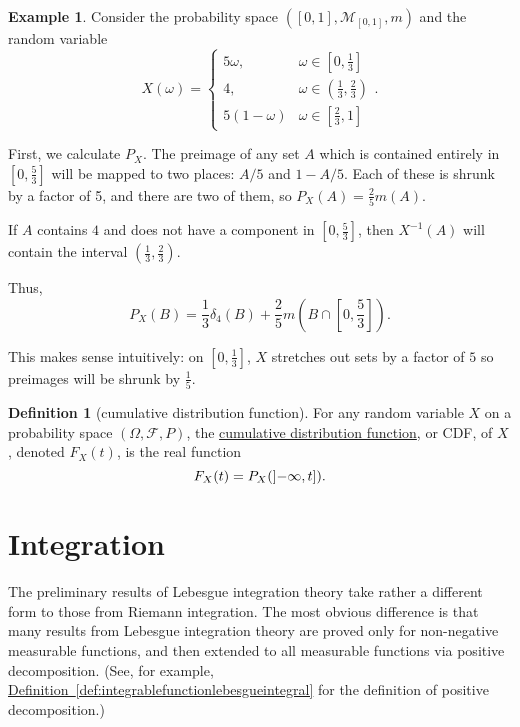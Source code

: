 \documentclass[a4paper]{scrartcl}
\newcommand{\defn}[1]{\ul{#1}}
\theoremstyle{definition}
\newtheorem{definition}{Definition}[section]
\newtheorem{example}{Example}[section]
\theoremstyle{plain}
\theoremstyle{remark}
\begin{document}
\begin{example}
  \label{eg:probabilitygeneratedbycomplicatedishfunction}
  Consider the probability space $\left( [0, 1], \mathcal{M}_{[0, 1]}, m \right)$ and the random variable
  \begin{equation*}
    X(\omega) =
    \begin{cases}
      5\omega, & \omega \in \left[ 0, \frac{1}{3} \right] \\
      4, & \omega \in \left( \frac{1}{3}, \frac{2}{3} \right) \\
      5(1-\omega) & \omega \in \left[ \frac{2}{3}, 1 \right]
    \end{cases}.
  \end{equation*}

  First, we calculate $P_{X}$. The preimage of any set $A$ which is contained entirely in $\left[ 0, \frac{5}{3} \right]$ will be mapped to two places: $A/5$ and $1 - A/5$. Each of these is shrunk by a factor of 5, and there are two of them, so $P_{X}(A) = \frac{2}{5}m(A)$.

  If $A$ contains $4$ and does not have a component in $\left[ 0, \frac{5}{3} \right]$, then $X^{-1}(A)$ will contain the interval $\left( \frac{1}{3}, \frac{2}{3} \right)$.

  Thus,
  \begin{equation*}
    P_{X}(B) = \frac{1}{3}\delta_{4}(B) + \frac{2}{5} m\left( B \cap \left[ 0, \frac{5}{3} \right] \right).
  \end{equation*}
\end{example}

This makes sense intuitively: on $[0, \frac{1}{3}]$, $X$ stretches out sets by a factor of $5$ so preimages will be shrunk by $\frac{1}{5}$.

\begin{definition}[cumulative distribution function]
  \label{def:cumulativedistributionfunction}
  For any random variable $X$ on a probability space $(\Omega, \mathcal{F}, P)$, the \defn{cumulative distribution function}, or CDF, of $X$, denoted $F_{X}(t)$, is the real function
  \begin{equation*}
  F_{X}(t) = P_{X}(\interval[open left]{-\infty}{t}).
\end{equation*}
\end{definition}
\section{Integration}
The preliminary results of Lebesgue integration theory take rather a different form to those from Riemann integration. The most obvious difference is that many results from Lebesgue integration theory are proved only for non-negative measurable functions, and then extended to all measurable functions via positive decomposition. (See, for example, \hyperref[def:integrablefunctionlebesgueintegral]{Definition~\ref*{def:integrablefunctionlebesgueintegral}} for the definition of positive decomposition.)
\end{document}
